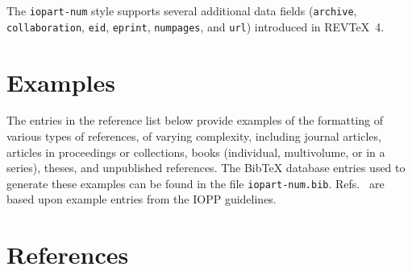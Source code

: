 \documentclass[12pt]{iopart}
\newcommand{\BibTeX}{Bib\TeX}
\newcommand{\REVTeX}{REV\TeX}
\begin{document}
The \texttt{iopart-num} style supports several additional data fields
(\verb+archive+, \verb+collaboration+, \verb+eid+, \verb+eprint+, 
\verb+numpages+, and \verb+url+) introduced in
\REVTeX{}~4.


\section{Examples}

The entries in the reference list below provide examples of the
formatting of various types of references, of varying complexity,
including journal articles, articles in proceedings or collections,
books (individual, multivolume, or in a series), theses, and
unpublished references.  The
\BibTeX{} database entries used to generate these examples can be
found in the file \texttt{iopart-num.bib}.
Refs.~\cite{ex1,ex2,ex3,ex4,ex5,ex6,ex7,ex8,ex9} are based upon example entries
from the IOPP guidelines.

\section*{References}

\end{document}
